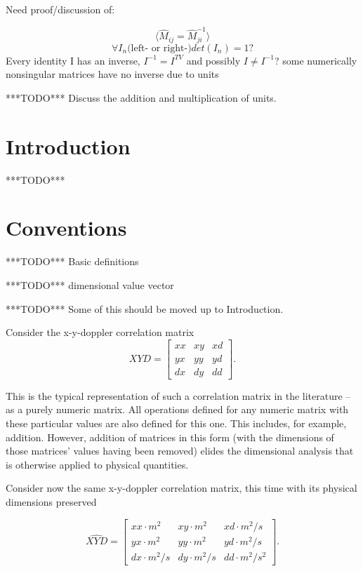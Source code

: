 \documentclass[10pt,letterpaper]{article}
\author{T. Zachary Laine}
\numberwithin{equation}{section}
\begin{document}
Need proof/discussion of:

\[ \langle \hat{M}_{ij} = \hat{M}^{-1}_{ji}\rangle \]
\[ \forall I_{n} \mbox{(left- or right-)} det(I_{n}) = 1 ? \]
Every identity I has an inverse, $I^{-1} = I^{TV}$ and possibly $I \not= I^{-1}$?
some numerically nonsingular matrices have no inverse due to units

***TODO*** Discuss the addition and multiplication of units.

\section{Introduction}

***TODO***

\section{Conventions}

***TODO*** Basic definitions

***TODO*** dimensional value vector

***TODO*** Some of this should be moved up to Introduction.

Consider the x-y-doppler correlation matrix
\[XYD = \left[ \begin{matrix}
xx & xy & xd \\ yx & yy & yd \\ dx & dy & dd
\end{matrix} \right]. \]

This is the typical representation of such a correlation matrix in the
literature – as a purely numeric matrix.  All operations defined for
any numeric matrix with these particular values are also defined for
this one.  This includes, for example, addition.  However, addition of
matrices in this form (with the dimensions of those matrices' values
having been removed) elides the dimensional analysis that is otherwise
applied to physical quantities.

Consider now the same x-y-doppler correlation matrix, this time with
its physical dimensions preserved

\[ \widehat{XYD}= \left[ \begin{matrix}
  xx \cdot m^2 & xy \cdot m^2 & xd \cdot m^2/s \\
  yx \cdot m^2 & yy \cdot m^2 & yd \cdot m^2/s \\
  dx \cdot m^2/s & dy \cdot m^2/s & dd \cdot m^2/s^2
\end{matrix} \right]. \]
\end{document}
